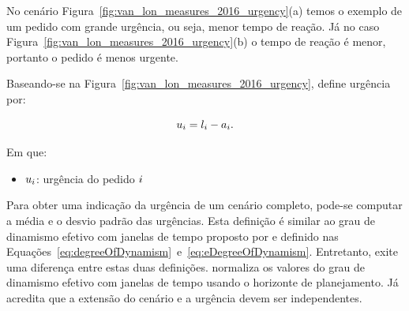 No cenário Figura~\ref{fig:van_lon_measures_2016_urgency}(a) temos o exemplo de
um pedido com grande urgência, ou seja, menor tempo de reação.
Já no caso Figura~\ref{fig:van_lon_measures_2016_urgency}(b) o tempo de reação
é menor, portanto o pedido é menos urgente.

Baseando-se na Figura~\ref{fig:van_lon_measures_2016_urgency}, 
 define urgência por:

\begin{equation}
    u_i = l_i - a_i.
    \label{eq:van_lon_measures_2016_urgency}
\end{equation}

Em que:
\begin{itemize}
  \item $u_i$: urgência do pedido $i$
\end{itemize}

Para obter uma indicação da urgência de um cenário completo, pode-se computar a
média e o desvio padrão das urgências. 
Esta definição é similar ao grau de dinamismo efetivo com janelas de tempo 
proposto por  e definido nas
Equações~\ref{eq:degreeOfDynamism}~e~\ref{eq:eDegreeOfDynamism}.
Entretanto, exite uma diferença entre estas duas definições.
 normaliza os valores do grau de dinamismo
efetivo com janelas de tempo usando o horizonte de planejamento.  
Já  acredita que a extensão do cenário e
a urgência devem ser independentes.

\fi

